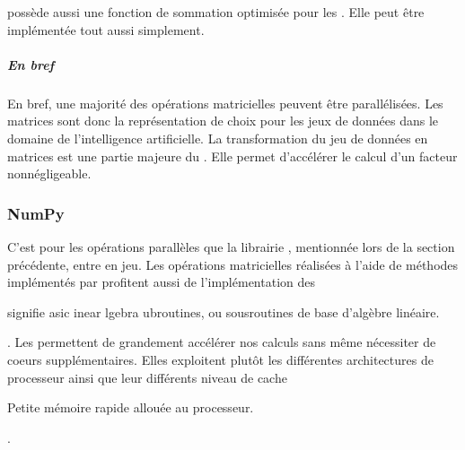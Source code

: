 \documentclass[letterpaper,10pt,french]{sphinxmanual}
\begin{document}
 possède aussi une fonction de sommation optimisée pour les . Elle peut être implémentée tout aussi simplement.

\begin{sphinxVerbatim}[commandchars=\\\{\}]
   
  \PYG{p}{[}\PYG{p}{]}
  
\end{sphinxVerbatim}


\subparagraph{En bref}
\label{\detokenize{preprocessing:en-bref}}
En bref, une majorité des opérations matricielles peuvent être parallélisées. Les matrices sont donc la représentation de choix pour les jeux de données dans le domaine de l’intelligence artificielle. La transformation du jeu de données en matrices est une partie majeure du . Elle permet d’accélérer le calcul d’un facteur non\sphinxhyphen{}négligeable.


\subsubsection{NumPy}
\label{\detokenize{preprocessing:numpy}}
C’est pour les opérations parallèles que la librairie , mentionnée lors de la section précédente, entre en jeu. Les opérations matricielles réalisées à l’aide de méthodes implémentés par profitent aussi de l’implémentation des %
\begin{footnote}[28]\sphinxAtStartFootnote
{} signifie asic inear lgebra ubroutines, ou sous\sphinxhyphen{}routines de base d’algèbre linéaire.
%
\end{footnote}. Les  permettent de grandement accélérer nos calculs sans même nécessiter de coeurs supplémentaires. Elles exploitent plutôt les différentes architectures de processeur ainsi que leur différents niveau de cache%
\begin{footnote}[29]\sphinxAtStartFootnote
Petite mémoire rapide allouée au processeur.
%
\end{footnote}.
\end{document}
